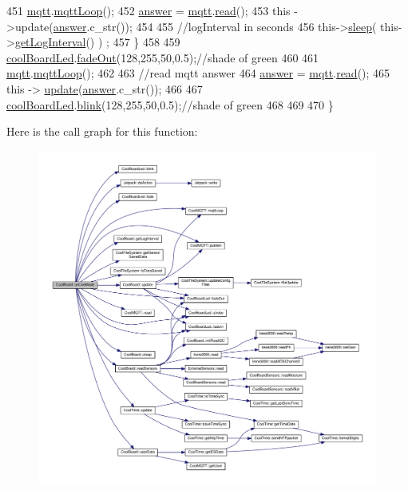 \begin{DoxyCode}
451         \hyperlink{classCoolBoard_a2399f44d7c23c1149a335cb3b46d90f1}{mqtt}.\hyperlink{classCoolMQTT_aa5eaae967b562b62cbcf2b8d81f6e5d5}{mqttLoop}();
452         \hyperlink{classCoolBoard_a7b835fafd449e5282f7f91d787a2dc15}{answer} = \hyperlink{classCoolBoard_a2399f44d7c23c1149a335cb3b46d90f1}{mqtt}.\hyperlink{classCoolMQTT_ae3c18f6ae9723746d32765f1c8f176ca}{read}();
453         \textcolor{keyword}{this} ->update(\hyperlink{classCoolBoard_a7b835fafd449e5282f7f91d787a2dc15}{answer}.c\_str());
454 
455         \textcolor{comment}{//logInterval in seconds}
456         this->\hyperlink{classCoolBoard_a069952cdcb2e7f68518aa429eceadb6e}{sleep}( this->\hyperlink{classCoolBoard_a7508e029f2ee17bb747ffab599285e0d}{getLogInterval}() ) ;
457     \}
458 
459     \hyperlink{classCoolBoard_a1b1d3c684a5baa56b08486e192fd8e97}{coolBoardLed}.\hyperlink{classCoolBoardLed_a93d545679237e8cc858324367149775c}{fadeOut}(128,255,50,0.5);\textcolor{comment}{//shade of green        }
460 
461     \hyperlink{classCoolBoard_a2399f44d7c23c1149a335cb3b46d90f1}{mqtt}.\hyperlink{classCoolMQTT_aa5eaae967b562b62cbcf2b8d81f6e5d5}{mqttLoop}();
462 
463     \textcolor{comment}{//read mqtt answer}
464     \hyperlink{classCoolBoard_a7b835fafd449e5282f7f91d787a2dc15}{answer} = \hyperlink{classCoolBoard_a2399f44d7c23c1149a335cb3b46d90f1}{mqtt}.\hyperlink{classCoolMQTT_ae3c18f6ae9723746d32765f1c8f176ca}{read}();
465     \textcolor{keyword}{this} -> \hyperlink{classCoolBoard_a8612756d3f73198cdde857a66f0fe690}{update}(\hyperlink{classCoolBoard_a7b835fafd449e5282f7f91d787a2dc15}{answer}.c\_str()); 
466 
467     \hyperlink{classCoolBoard_a1b1d3c684a5baa56b08486e192fd8e97}{coolBoardLed}.\hyperlink{classCoolBoardLed_a96e1ea13003eee34c9dbcef340404426}{blink}(128,255,50,0.5);\textcolor{comment}{//shade of green    }
468 
469 
470 \}
\end{DoxyCode}
Here is the call graph for this function\+:
\nopagebreak
\begin{figure}[H]
\begin{center}
\leavevmode
\includegraphics[width=350pt]{classCoolBoard_aa0bbc4bc605e35618d18e68795c61363_cgraph}
\end{center}
\end{figure}
